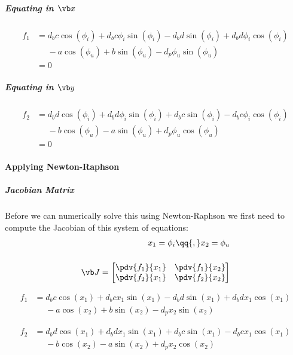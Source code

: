 \subparagraph{Equating in $\vb x$}
\begin{equation}
\begin{aligned}
    f_1     &= d_bc\cos(\phi_i) + d_bc\phi_i\sin(\phi_i) - d_bd\sin(\phi_i) + d_bd\phi_i\cos(\phi_i) \\
            &\phantom{=}- a\cos(\phi_u) + b\sin(\phi_u) - d_p\phi_u\sin(\phi_u)\\
            &= 0
\end{aligned}
\end{equation}

\subparagraph{Equating in $\vb y$}
\begin{equation}
\begin{aligned}
    f_2     &= d_bd\cos(\phi_i) + d_bd\phi_i\sin(\phi_i) + d_bc\sin(\phi_i) - d_bc\phi_i\cos(\phi_i) \\
            &\phantom{=}- b\cos(\phi_u) - a \sin(\phi_u) + d_p\phi_u\cos(\phi_u) \\
            &= 0
\end{aligned}
\end{equation}

\paragraph{Applying Newton-Raphson}

\subparagraph{Jacobian Matrix}
Before we can numerically solve this using Newton-Raphson we first need to compute the Jacobian of this system of equations:
\begin{align}
    x_1     = \phi_i \qq{,} x_2=\phi_u \\[3ex]
    \vb J   =   \begin{bmatrix}
                    \pdv{f_1}{x_1} & \pdv{f_1}{x_2} \\
                    \pdv{f_2}{x_1} & \pdv{f_2}{x_2}
                \end{bmatrix}
\end{align}

\begin{equation}
\begin{aligned}
    f_1 &= d_bc\cos(x_1) + d_bcx_1\sin(x_1) - d_bd\sin(x_1) + d_bdx_1\cos(x_1) \\
        &\phantom{=}- a\cos(x_2) + b\sin(x_2) - d_px_2\sin(x_2)
\end{aligned}
\end{equation}

\begin{equation}
\begin{aligned}
    f_2 &= d_bd\cos(x_1) + d_bdx_1\sin(x_1) + d_bc\sin(x_1) -d_bcx_1\cos(x_1) \\
        &\phantom{=}-b\cos(x_2) - a \sin(x_2) + d_px_2\cos(x_2)
\end{aligned}
\end{equation}

